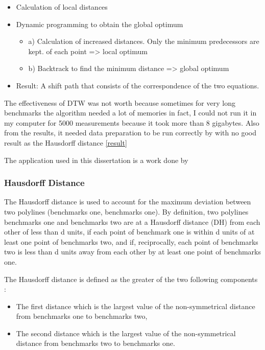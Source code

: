 \documentclass{article}
\begin{document}
\begin{itemize}
    \item Calculation of local distances
    \item Dynamic programming to obtain the global optimum \begin{itemize}
        \item a) Calculation of increased distances. Only the minimum predecessors are kept. of each point => local optimum
        \item b) Backtrack to find the minimum distance => global optimum
    \end{itemize}
    \item Result: A shift path that consists of the correspondence of the two equations.
\end{itemize}

The effectiveness of DTW was not worth because sometimes for very long benchmarks the algorithm needed a lot of memories in fact, I could not run it in my computer for 5000 measurements because it took more than 8 gigabytes.
Also from the results, it needed data preparation to be run correctly by with no good result as the Hausdorff distance \ref{result}

The application used in this dissertation is a work done by \citep{salvador2007toward}

\subsubsection{Hausdorff Distance }
The Hausdorff distance \citep{belogay1997calculating} is used to account for the maximum deviation between two polylines (benchmarks one, benchmarks one). By definition, two polylines benchmarks one and benchmarks two are at a Hausdorff distance (DH) from each other of less than d units, if each point of benchmark one is within d units of at least one point of benchmarks two, and if, reciprocally, each point of benchmarks two is less than d units away from each other by at least one point of benchmarks one.

The Hausdorff distance is defined as the greater of the two following components :

\begin{itemize}
    \item The first distance which is the largest value of the non-symmetrical distance from benchmarks one to benchmarks two,
    \item The second distance which is the largest value of the non-symmetrical distance from benchmarks two to benchmarks one.
\end{itemize}
\end{document}
